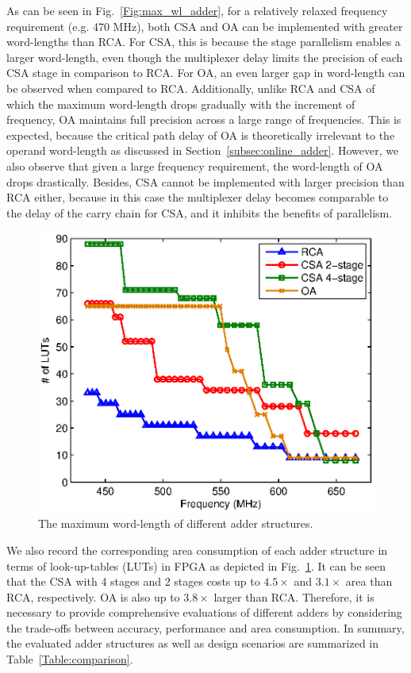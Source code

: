 \documentclass[10pt, conference, compsocconf]{IEEEtran}
\begin{document}
As can be seen in Fig.~\ref{Fig:max_wl_adder}, for a relatively relaxed frequency requirement (e.g. 470 MHz), both CSA and OA can be implemented with greater word-lengths than RCA. For CSA, this is because the stage parallelism enables a larger word-length, even though the multiplexer delay limits the precision of each CSA stage in comparison to RCA. For OA, an even larger gap in word-length can be observed when compared to RCA. Additionally, unlike RCA and CSA of which the maximum word-length drops gradually with the increment of frequency, OA maintains full precision across a large range of frequencies. This is expected, because the critical path delay of OA is theoretically irrelevant to the operand word-length as discussed in Section~\ref{subsec:online_adder}. However, we also observe that given a large frequency requirement, the word-length of OA drops drastically. Besides, CSA cannot be implemented with larger precision than RCA either, because in this case the multiplexer delay becomes comparable to the delay of the carry chain for CSA, and it inhibits the benefits of parallelism. 
%
\begin{figure}[tbp]
  \centering
  \includegraphics[width=.5\textwidth]{./figures/exp/area_adders.eps}
  \vspace{-4ex}
  \caption{The maximum word-length of different adder structures.}
  \label{Fig:area_adder}
\end{figure}

We also record the corresponding area consumption of each adder structure in terms of look-up-tables (LUTs) in FPGA as depicted in Fig.~\ref{Fig:area_adder}. It can be seen that the CSA with 4 stages and 2 stages costs up to $4.5\times$ and $3.1\times$ area than RCA, respectively. OA is also up to $3.8\times$ larger than RCA. Therefore, it is necessary to provide comprehensive evaluations of different adders by considering the trade-offs between accuracy, performance and area consumption. In summary, the evaluated adder structures as well as design scenarios are summarized in Table~\ref{Table:comparison}.
\end{document}
